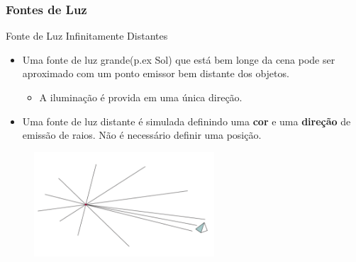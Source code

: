 \documentclass{beamer}
\begin{document}
\begin{frame}
\frametitle{Fontes de Luz}

	\begin{block}{Fonte de Luz Infinitamente Distantes}
		\begin{itemize}
			\item Uma fonte de luz grande(p.ex Sol) que está bem longe da cena pode ser aproximado com um ponto emissor bem distante dos objetos.
			\begin{itemize}
				\item A iluminação é provida em uma única direção.
			\end{itemize}
			\item Uma fonte de luz distante é simulada definindo uma \textbf{cor} e uma \textbf{direção} de emissão de raios. Não é necessário definir uma posição.
		\end{itemize}
	\end{block}
		\begin{figure}[!h]
			\begin{center}
			\includegraphics[width=0.6\textwidth]{Figures/FonDis}
			\end{center}
	\end{figure}
\end{frame}
\end{document}
